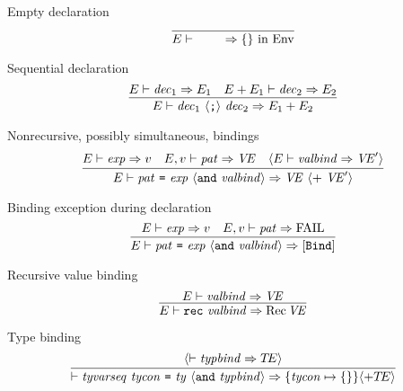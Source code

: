 \begin{inference-rule}{Empty declaration}
\begin{equation}\label{rule:dynamic-core:empty-declaration}
\vcenter{\infer{\E\ts\emptydec\ra\emptymap\ \In\ \Env}
  {}}
\end{equation}
\end{inference-rule}

\begin{inference-rule}{Sequential declaration}
\begin{equation}\label{rule:dynamic-core:sequential-declaration}
\vcenter{\infer{\E\ts\seqdec\ra\plusmap{E_{1}}{E_{2}}}
  {\E\ts\dec_{1}\ra\E_{1}
    &\E+\E_{1}\ts\dec_{2}\ra\E_{2}}}
\end{equation}
\end{inference-rule}


\begin{inference-rule}{Nonrecursive, possibly simultaneous, bindings}
\begin{equation}\label{rule:dynamic-core:valbind1}
\vcenter{\infer{\E\ts\longvalbind\ra\VE\ \optional{ +\ \VE'}}
  {\E\ts\exp\ra\V
    & \E,\V\ts\pat\ra\VE
    & \optional{\E\ts\valbind\ra\VE'}}}
\end{equation}
\end{inference-rule}

\begin{inference-rule}{Binding exception during declaration}
\begin{equation}\label{rule:dynamic-core:binding-exception}
\vcenter{\infer{\E\ts\longvalbind\ra[\ml{Bind}]}
  {\E\ts\exp\ra\V
    & \E,\V\ts\pat\ra\FAIL}}
\end{equation}
\end{inference-rule}

\begin{inference-rule}{Recursive value binding}
\begin{equation}\label{rule:dynamic-core:recursive-value-binding}
\vcenter{\infer{\E\ts\recvalbind\ra\Rec\VE}
  {\E\ts\valbind\ra\VE}}
\end{equation}
\end{inference-rule}

\begin{inference-rule}{Type binding}
\begin{equation}\label{rule:dynamic-core:type-binding}
\vcenter{\infer{\ts\longtypbind\ra\{\tycon\mapsto\emptymap\}\optional{+\TE}}
  {\optional{\ts\typbind\ra\TE}}}
\end{equation}
\end{inference-rule}

